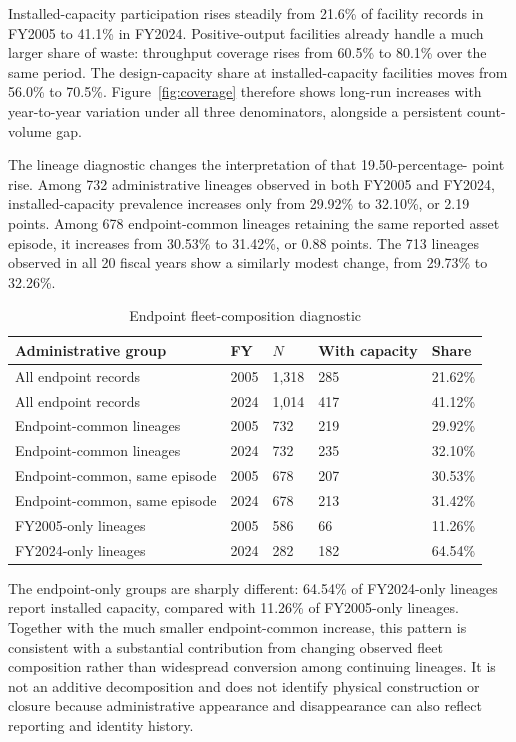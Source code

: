 \documentclass[12pt,a4paper]{article}
\begin{document}
Installed-capacity participation rises steadily from 21.6\% of facility records
in FY2005 to 41.1\% in FY2024. Positive-output facilities already handle a much
larger share of waste: throughput coverage rises from 60.5\% to 80.1\% over the
same period. The design-capacity share at installed-capacity facilities moves
from 56.0\% to 70.5\%. Figure~\ref{fig:coverage} therefore shows long-run
increases with year-to-year variation under all three denominators, alongside a
persistent count-volume gap.

The lineage diagnostic changes the interpretation of that 19.50-percentage-
point rise. Among 732 administrative lineages observed in both FY2005 and
FY2024, installed-capacity prevalence increases only from 29.92\% to 32.10\%,
or 2.19 points. Among 678 endpoint-common lineages retaining the same reported
asset episode, it increases from 30.53\% to 31.42\%, or 0.88 points. The 713
lineages observed in all 20 fiscal years show a similarly modest change, from
29.73\% to 32.26\%.

\begin{table}[!htbp]
\centering
\caption{Endpoint fleet-composition diagnostic}
\label{tab:endpoint-composition}
\small
\setlength{\tabcolsep}{4pt}
\renewcommand{\arraystretch}{1.08}
\begin{tabularx}{\textwidth}{Y R{0.9cm} R{1.25cm} R{1.65cm} R{1.2cm}}
\toprule
Administrative group & FY & $N$ & With capacity & Share \\
\midrule
All endpoint records & 2005 & 1,318 & 285 & 21.62\% \\
All endpoint records & 2024 & 1,014 & 417 & 41.12\% \\
Endpoint-common lineages & 2005 & 732 & 219 & 29.92\% \\
Endpoint-common lineages & 2024 & 732 & 235 & 32.10\% \\
Endpoint-common, same episode & 2005 & 678 & 207 & 30.53\% \\
Endpoint-common, same episode & 2024 & 678 & 213 & 31.42\% \\
FY2005-only lineages & 2005 & 586 & 66 & 11.26\% \\
FY2024-only lineages & 2024 & 282 & 182 & 64.54\% \\
\bottomrule
\end{tabularx}
\renewcommand{\arraystretch}{1}
\normalsize
\end{table}

The endpoint-only groups are sharply different: 64.54\% of FY2024-only
lineages report installed capacity, compared with 11.26\% of FY2005-only
lineages. Together with the much smaller endpoint-common increase, this pattern
is consistent with a substantial contribution from changing observed fleet
composition rather than widespread conversion among continuing lineages. It is
not an additive decomposition and does not identify physical construction or closure because
administrative appearance and disappearance can also reflect reporting and
identity history.
\end{document}
